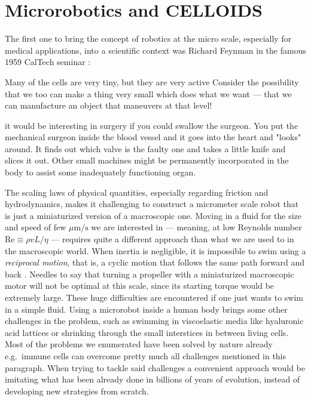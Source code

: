 \documentclass[../../master_thesis_np.tex]{subfiles}
\begin{document}
	
	\section{Microrobotics and CELLOIDS}
	The first one to bring the concept of robotics at the micro scale, especially for medical applications, into a scientific context was Richard Feynman in the famous 1959 CalTech seminar  \cite{Feynman}:
	\begin{displayquote}
		Many of the cells are very tiny, but they are very active \omissis Consider the possibility that we too can make a thing very small which does what we want — that we can manufacture an object that maneuvers at that level!
		
		\omissis it would be interesting in surgery if you could swallow the surgeon. You put the mechanical surgeon inside the blood vessel and it goes into the heart and "looks" around. \omissis It finds out which valve is the faulty one and takes a little knife and slices it out. Other small machines might be permanently incorporated in the body to assist some inadequately functioning organ.
	\end{displayquote}
	
	The scaling laws of physical quantities, especially regarding friction and hydrodynamics, makes it challenging to construct a micrometer scale robot that is just a miniaturized version of a macroscopic one. 
	Moving in a fluid for the size and speed of few $\mu\text{m/s}$ we are interested in --- meaning, at low Reynolds number $\mathrm{Re} \equiv \rho v L/\eta$ --- requires quite a different approach than what we are used to in the macroscopic world. 
	When inertia is negligible, it is impossible to swim using a \emph{reciprocal motion}, that is, a cyclic motion that follows the same path forward and back \cite{purcell_life_1977}. 
	Needles to say that turning a propeller with a miniaturized macroscopic motor will not be optimal at this scale, since its starting torque would be extremely large. 
	These huge difficulties are encountered if one just wants to swim in a simple fluid. 
	Using a microrobot inside a human body brings some other challenges in the problem, such as swimming in viscoelastic media like hyaluronic acid lattices or shrinking through the small interstices in between living cells. 
	Most of the problems we enumerated have been solved by nature already e.g.\ immune cells can overcome pretty much all challenges mentioned in this paragraph. 
	When trying to tackle said challenges a convenient approach would be imitating what has been already done in billions of years of evolution, instead of developing new strategies from scratch.
	
\end{document}
